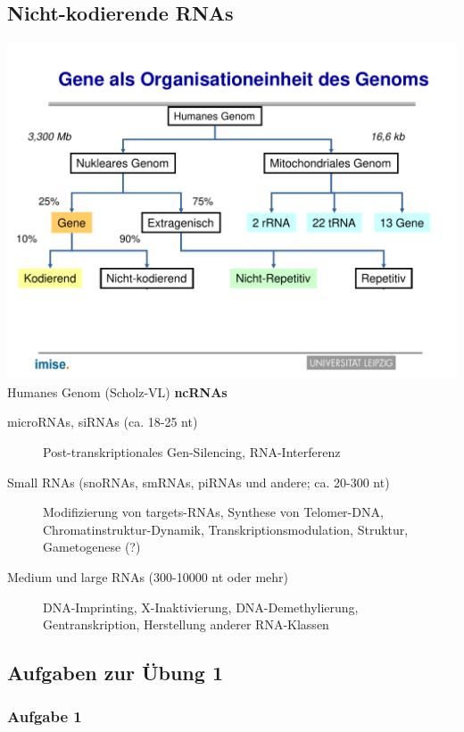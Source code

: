 \subsection{Nicht-kodierende RNAs}
\includegraphics[width=1\textwidth]{lectures/V1/pix/31.pdf}\\
Humanes Genom (Scholz-VL)
\textbf{ncRNAs}
\begin{description}
    \item[microRNAs, siRNAs (ca. 18-25 nt)] Post-transkriptionales Gen-Silencing, RNA-Interferenz
    \item[Small RNAs (snoRNAs, smRNAs, piRNAs und andere; ca. 20-300 nt)] Modifizierung von targets-RNAs, Synthese von Telomer-DNA, Chromatinstruktur-Dynamik, Transkriptionsmodulation, Struktur, Gametogenese (?)
    \item[Medium und large RNAs (300-10000 nt oder mehr)] DNA-Imprinting, X-Inaktivierung, DNA-Demethylierung, Gentranskription, Herstellung anderer RNA-Klassen
\end{description}

\subsection{Aufgaben zur Übung 1}
\subsubsection{Aufgabe 1}

